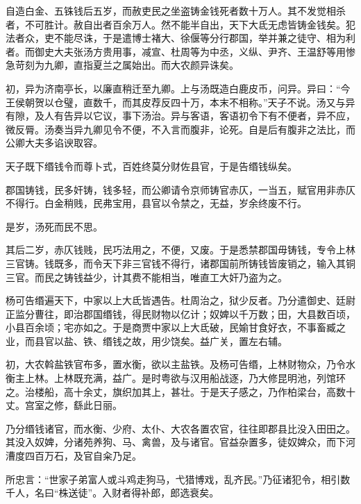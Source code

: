 \documentclass[12pt,UTF8]{ctexbook}
\begin{document}
自造白金、五铢钱后五岁，而赦吏民之坐盗铸金钱死者数十万人。其不发觉相杀者，不可胜计。赦自出者百余万人。然不能半自出，天下大氐无虑皆铸金钱矣。犯法者众，吏不能尽诛，于是遣博士褚大、徐偃等分行郡国，举并兼之徒守、相为利者。而御史大夫张汤方贵用事，减宣、杜周等为中丞，义纵、尹齐、王温舒等用惨急苛刻为九卿，直指夏兰之属始出。而大农颜异诛矣。



初，异为济南亭长，以廉直稍迁至九卿。上与汤既造白鹿皮币，问异。异曰：“今王侯朝贺以仓璧，直数千，而其皮荐反四十万，本末不相称。”天子不说。汤又与异有隙，及人有告异以它议，事下汤治。异与客语，客语初令下有不便者，异不应，微反脣。汤奏当异九卿见令不便，不入言而腹非，论死。自是后有腹非之法比，而公卿大夫多谄谀取容。



天子既下缗钱令而尊卜式，百姓终莫分财佐县官，于是告缗钱纵矣。



郡国铸钱，民多奸铸，钱多轻，而公卿请令京师铸官赤仄，一当五，赋官用非赤仄不得行。白金稍贱，民弗宝用，县官以令禁之，无益，岁余终废不行。



是岁，汤死而民不思。



其后二岁，赤仄钱贱，民巧法用之，不便，又废。于是悉禁郡国毋铸钱，专令上林三官铸。钱既多，而令天下非三官钱不得行，诸郡国前所铸钱皆废销之，输入其铜三官。而民之铸钱益少，计其费不能相当，唯直工大奸乃盗为之。



杨可告缗遍天下，中家以上大氐皆遇告。杜周治之，狱少反者。乃分遣御史、廷尉正监分曹往，即治郡国缗钱，得民财物以亿计；奴婢以千万数；田，大县数百顷，小县百余顷；宅亦如之。于是商贾中家以上大氐破，民媮甘食好衣，不事畜臧之业，而县官以盐、铁、缗钱之故，用少饶矣。益广关，置左右辅。



初，大农斡盐铁官布多，置水衡，欲以主盐铁。及杨可告缗，上林财物众，乃令水衡主上林。上林既充满，益广。是时粤欲与汉用船战逐，乃大修昆明池，列馆环之。治楼船，高十余丈，旗织加其上，甚壮。于是天子感之，乃作柏梁台，高数十丈。宫室之修，繇此日丽。



乃分缗钱诸官，而水衡、少府、太仆、大农各置农官，往往即郡县比没入田田之。其没入奴婢，分诸苑养狗、马、禽兽，及与诸官。官益杂置多，徒奴婢众，而下河漕度四百万石，及官自籴乃足。



所忠言：“世家子弟富人或斗鸡走狗马，弋猎博戏，乱齐民。”乃征诸犯令，相引数千人，名曰“株送徒”。入财者得补郎，郎选衰矣。
\end{document}
